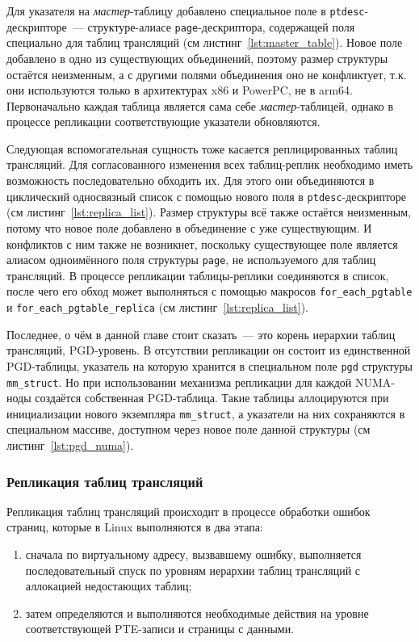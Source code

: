 Для указателя на \textit{мастер}-таблицу добавлено специальное поле в \texttt{ptdesc}-дескрипторе~--- структуре-алиасе \texttt{page}-дескриптора, содержащей поля специально для таблиц трансляций (см листинг~\ref{lst:master_table}). Новое поле добавлено в одно из существующих объединений, поэтому размер структуры остаётся неизменным, а с другими полями объединения оно не конфликтует, т.к. они используются только в архитектурах x86 и PowerPC, не в arm64. Первоначально каждая таблица является сама себе \textit{мастер}-таблицей, однако в процессе репликации соответствующие указатели обновляются.

Следующая вспомогательная сущность тоже касается реплицированных таблиц трансляций. Для согласованного изменения всех таблиц-реплик необходимо иметь возможность последовательно обходить их. Для этого они объединяются в циклический односвязный список с помощью нового поля в \texttt{ptdesc}-дескрипторе (см листинг~\ref{lst:replica_list}). Размер структуры всё также остаётся неизменным, потому что новое поле добавлено в объединение с уже существующим. И конфликтов с ним также не возникнет, поскольку существующее поле является алиасом одноимённого поля структуры \texttt{page}, не используемого для таблиц трансляций. В процессе репликации таблицы-реплики соединяются в список, после чего его обход может выполняться с помощью макросов \texttt{for\_each\_pgtable} и \texttt{for\_each\_pgtable\_replica} (см листинг~\ref{lst:replica_list}).

Последнее, о чём в данной главе стоит сказать~--- это корень иерархии таблиц трансляций, PGD-уровень. В отсутствии репликации он состоит из единственной PGD-таблицы, указатель на которую хранится в специальном поле \texttt{pgd} структуры \texttt{mm\_struct}. Но при использовании механизма репликации для каждой NUMA-ноды создаётся собственная PGD-таблица. Такие таблицы аллоцируются при инициализации нового экземпляра \texttt{mm\_struct}, а указатели на них сохраняются в специальном массиве, доступном через новое поле данной структуры (см листинг~\ref{lst:pgd_numa}).

\subsubsection{Репликация таблиц трансляций}

Репликация таблиц трансляций происходит в процессе обработки ошибок страниц, которые в Linux выполняются в два этапа:
\begin{enumerate}
	\item сначала по виртуальному адресу, вызвавшему ошибку, выполняется последовательный спуск по уровням иерархии таблиц трансляций с аллокацией недостающих таблиц;
	\item затем определяются и выполняются необходимые действия на уровне соответствующей PTE-записи и страницы с данными.
\end{enumerate}

